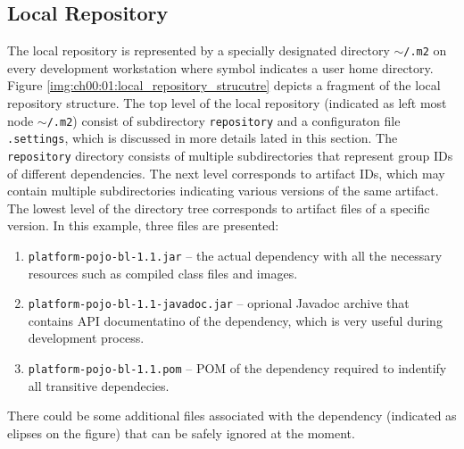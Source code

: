   \subsection*{Local Repository}
  The local repository is represented by a specially designated directory \texttt{$\sim$/.m2} on every development workstation where symbol \tikzinline{$\sim$} indicates a user home directory.
  Figure \ref{img:ch00:01:local_repository_strucutre} depicts a fragment of the local repository structure.
  The top level of the local repository (indicated as left most node \texttt{$\sim$/.m2}) consist of subdirectory \texttt{repository} and a configuraton file \texttt{.settings}, which is discussed in more details lated in this section.
  The \texttt{repository} directory consists of multiple subdirectories that represent group IDs of different dependencies.
  The next level corresponds to artifact IDs, which may contain multiple subdirectories indicating various versions of the same artifact.
  The lowest level of the directory tree corresponds to artifact files of a specific version.
  In this example, three files are presented:
  \begin{enumerate}
    \item \texttt{platform-pojo-bl-1.1.jar} -- the actual dependency with all the necessary resources such as compiled class files and images.
    \item \texttt{platform-pojo-bl-1.1-javadoc.jar} -- oprional Javadoc archive that contains API documentatino of the dependency, which is very useful during development process.
    \item \texttt{platform-pojo-bl-1.1.pom} -- POM of the dependency required to indentify all transitive dependecies.
  \end{enumerate}
  There could be some additional files associated with the dependency (indicated as elipses on the figure) that can be safely ignored at the moment.

